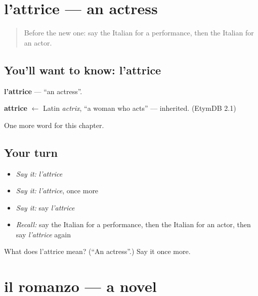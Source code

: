 \section[l'attrice]{l'attrice — an actress}

\label{lesson:IT-C194-attrice}



\begin{quote}
Before the new one: say the Italian for a performance, then the Italian for an actor.
\end{quote}

\subsection*{You'll want to know: l'attrice}
\textbf{l'attrice} — \textquotedblleft{}an actress\textquotedblright{}.

\begin{cousinweb}
\textbf{attrice} $\leftarrow$ Latin \emph{actrix}, \textquotedblleft{}a woman who acts\textquotedblright{} — inherited. (EtymDB 2.1)
\end{cousinweb}

\begin{grammarlens}[title={What you've built}]
One more word for this chapter.
\end{grammarlens}

\subsection*{Your turn}
\begin{itemize}
\raggedright
  \item \emph{Say it:} \emph{l'attrice}
  \item \emph{Say it:} \emph{l'attrice}, once more
  \item \emph{Say it:} say \emph{l'attrice}
  \item \emph{Recall:} say the Italian for a performance, then the Italian for an actor, then say \emph{l'attrice} again
\end{itemize}

\begin{tcolorbox}[breakable,colback=teal!4,colframe=teal!35!black,title={Before you move on}]
What does l'attrice mean? (\textquotedblleft{}An actress\textquotedblright{}.) Say it once more.
\end{tcolorbox}
\section[il romanzo]{il romanzo — a novel}

